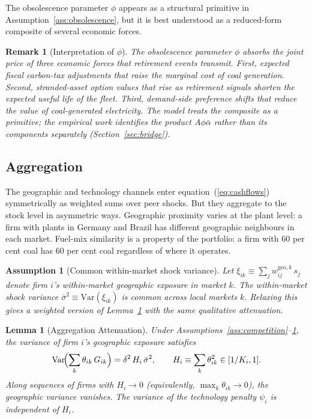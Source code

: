 \documentclass[12pt,a4paper]{article}
\newtheorem{assumption}{Assumption}
\newtheorem{lemma}{Lemma}
\newtheorem{remark}{Remark}
\begin{document}
The obsolescence parameter $\phi$ appears as a structural primitive in Assumption~\ref{ass:obsolescence}, but it is best understood as a reduced-form composite of several economic forces.

\begin{remark}[Interpretation of $\phi$]\label{rem:phi_interpretation}
The obsolescence parameter $\phi$ absorbs the joint price of three economic forces that retirement events transmit. First, expected fiscal carbon-tax adjustments that raise the marginal cost of coal generation. Second, stranded-asset option values that rise as retirement signals shorten the expected useful life of the fleet. Third, demand-side preference shifts that reduce the value of coal-generated electricity. The model treats the composite as a primitive; the empirical work identifies the product $A\phi\bar{\alpha}$ rather than its components separately (Section~\ref{sec:bridge}).
\end{remark}

\subsection{Aggregation}\label{sec:aggregation}

The geographic and technology channels enter equation~(\ref{eq:cashflows}) symmetrically as weighted sums over peer shocks. But they aggregate to the stock level in asymmetric ways. Geographic proximity varies at the plant level: a firm with plants in Germany and Brazil has different geographic neighbours in each market. Fuel-mix similarity is a property of the portfolio: a firm with 60 per cent coal has 60 per cent coal regardless of where it operates.

\begin{assumption}[Common within-market shock variance]\label{ass:variance}
Let $\xi_{ik} \equiv \sum_j w^{\mathrm{geo},k}_{ij}\, s_j$ denote firm $i$'s within-market geographic exposure in market $k$. The within-market shock variance $\bar{\sigma}^2 \equiv \mathrm{Var}(\xi_{ik})$ is common across local markets $k$. Relaxing this gives a weighted version of Lemma~\ref{lem:aggregation} with the same qualitative attenuation.
\end{assumption}

\begin{lemma}[Aggregation Attenuation]\label{lem:aggregation}
    Under Assumptions~\ref{ass:competition}--\ref{ass:variance}, the variance of firm $i$'s geographic exposure satisfies
    \[
    \mathrm{Var}\!\Bigl(\sum_k \theta_{ik}\, G_{ik}\Bigr) = \delta^2\, H_i\, \bar{\sigma}^2, \qquad H_i \equiv \sum_k \theta_{ik}^2 \in [1/K_i, 1].
    \]
    Along sequences of firms with $H_i \to 0$ (equivalently, $\max_k \theta_{ik} \to 0$), the geographic variance vanishes. The variance of the technology penalty $\psi_i$ is independent of $H_i$.
\end{lemma}
\end{document}
